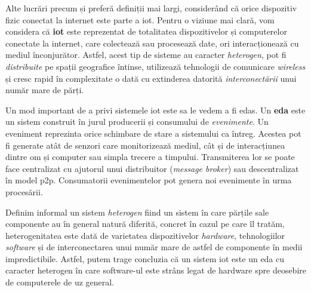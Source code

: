 
Alte lucrări precum \cite{Lee2015} și \cite{Huang2015} preferă definiții mai largi, considerând că orice dispozitiv fizic conectat la internet este parte a \acrshort{iot}. Pentru o viziune mai clară, vom considera că \textbf{\acrshort{iot}} este reprezentat de totalitatea dispozitivelor și computerelor conectate la internet, care colectează sau procesează date, ori interacționează cu mediul înconjurător. Astfel, acest tip de sisteme au caracter \emph{heterogen}, pot fi \emph{distribuite} pe spații geografice întinse, utilizează tehnologii de comunicare \emph{wireless} și cresc rapid în complexitate o dată cu extinderea datorită \emph{interconectării} unui număr mare de părți.



Un mod important de a privi sistemele \acrshort{iot} este sa le vedem a fi \acrfull{edas}. Un \textbf{\acrshort{eda}} este un sistem construit în jurul producerii și consumului de \emph{evenimente}. Un eveniment reprezinta orice schimbare de stare a sistemului ca întreg. Acestea pot fi generate atât de senzori care monitorizează mediul, cât și de interacțiunea dintre om și computer sau simpla trecere a timpului. Transmiterea lor se poate face centralizat cu ajutorul unui distribuitor (\textit{message broker}) sau descentralizat în model \acrfull{p2p}. Consumatorii evenimentelor pot genera noi evenimente în urma procesării.

Definim informal un sistem \emph{heterogen} fiind un sistem în care părțile sale componente au în general natură diferită, concret în cazul pe care îl tratăm, heterogenitatea este dată de varietatea dispozitivelor \emph{hardware}, tehnologiilor \emph{software} și de interconectarea unui număr mare de astfel de componente în medii impredictibile. Astfel, putem trage concluzia că un sistem \acrshort{iot} este un \acrshort{eda} cu caracter heterogen în care software-ul este strâns legat de hardware spre deosebire de computerele de uz general. 

